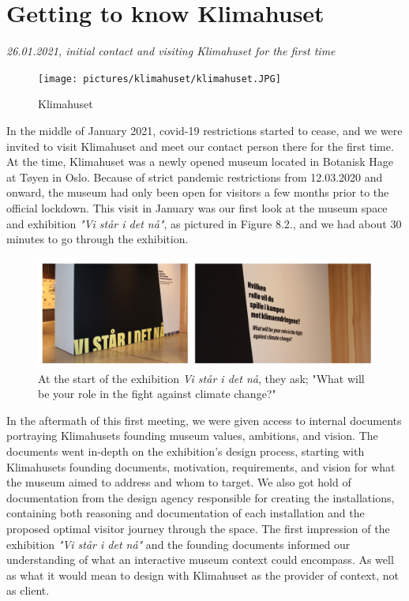 
\section{Getting to know Klimahuset}
\par
\emph{26.01.2021, initial contact and visiting Klimahuset for the first time}
\par

\begin{figure}[H]
\texttt{[image: pictures/klimahuset/klimahuset.JPG]}
\caption{Klimahuset}
\centering 
\end{figure}

In the middle of January 2021, covid-19 restrictions started to cease, and we were invited to visit Klimahuset and meet our contact person there for the first time. At the time, Klimahuset was a newly opened museum located in Botanisk Hage at Tøyen in Oslo. Because of strict pandemic restrictions from 12.03.2020 and onward, the museum had only been open for visitors a few months prior to the official lockdown. This visit in January was our first look at the museum space and exhibition \emph{"Vi står i det nå"}, as pictured in Figure 8.2., and we had about 30 minutes to go through the exhibition.

\begin{figure}[H]
\includegraphics[width=12.5cm]{pictures/process/staar_i_det_naa.png}
\caption{At the start of the exhibition \emph{Vi står i det nå}, they ask; "What will be your role in the fight against climate change?"}
\centering 
\end{figure}

In the aftermath of this first meeting, we were given access to internal documents portraying Klimahusets founding museum values, ambitions, and vision. The documents went in-depth on the exhibition's design process, starting with Klimahusets founding documents, motivation, requirements, and vision for what the museum aimed to address and whom to target. We also got hold of documentation from the design agency responsible for creating the installations, containing both reasoning and documentation of each installation and the proposed optimal visitor journey through the space. The first impression of the exhibition \emph{"Vi står i det nå"} and the founding documents informed our understanding of what an interactive museum context could encompass. As well as what it would mean to design with Klimahuset as the provider of context, not as client.

